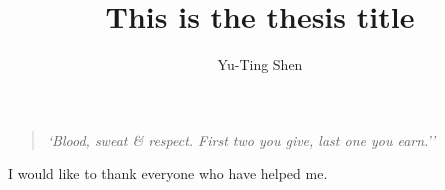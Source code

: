 \documentclass[hyperlinks]{outhesis}
\begin{document}
\author{Yu-Ting Shen}
\title{This is the thesis title}
\address{Norman, Oklahoma}

\begin{dedication}
\begin{quotation}
\raggedright{\emph{`Blood, sweat \& respect. First two you give, last one you earn.''}} \\
\end{quotation}

\end{dedication}

\begin{acknowledgements}
I would like to thank everyone who have helped me.


\end{acknowledgements}
\end{document}
